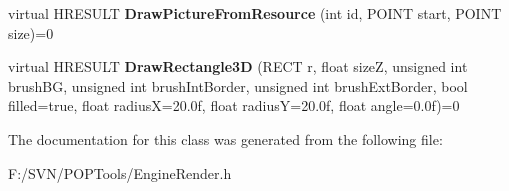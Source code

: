 \begin{DoxyCompactItemize}
\item 
\hypertarget{class_engine_render_a16841455d17cccb27b468e2953d66083}{virtual H\-R\-E\-S\-U\-L\-T {\bfseries Draw\-Picture\-From\-Resource} (int id, P\-O\-I\-N\-T start, P\-O\-I\-N\-T size)=0}\label{class_engine_render_a16841455d17cccb27b468e2953d66083}

\item 
\hypertarget{class_engine_render_a22c73482820f4481e001d7167c5ab151}{virtual H\-R\-E\-S\-U\-L\-T {\bfseries Draw\-Rectangle3\-D} (R\-E\-C\-T r, float size\-Z, unsigned int brush\-B\-G, unsigned int brush\-Int\-Border, unsigned int brush\-Ext\-Border, bool filled=true, float radius\-X=20.\-0f, float radius\-Y=20.\-0f, float angle=0.\-0f)=0}\label{class_engine_render_a22c73482820f4481e001d7167c5ab151}

\end{DoxyCompactItemize}


The documentation for this class was generated from the following file\-:\begin{DoxyCompactItemize}
\item 
F\-:/\-S\-V\-N/\-P\-O\-P\-Tools/Engine\-Render.\-h\end{DoxyCompactItemize}
